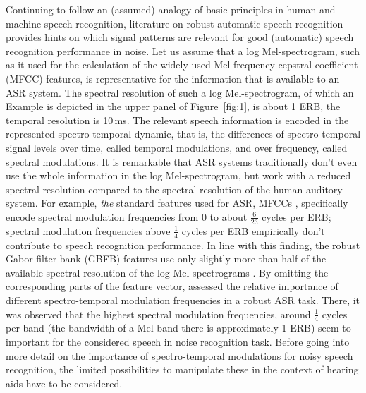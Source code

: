 \documentclass[10pt,a4paper,twocolumn]{article}
\begin{document}
Continuing to follow an (assumed) analogy of basic principles in human and machine speech recognition, literature on robust automatic speech recognition provides hints on which signal patterns are relevant for good (automatic) speech recognition performance in noise.
%
Let us assume that a log Mel-spectrogram, such as it used for the calculation of the widely used Mel-frequency cepstral coefficient (MFCC) features, is representative for the information that is available to an ASR system.
%
The spectral resolution of such a log Mel-spectrogram, of which an Example is depicted in the upper panel of Figure~\ref{fig:1}, is about 1 ERB, the temporal resolution is 10\,ms.
%
The relevant speech information is encoded in the represented spectro-temporal dynamic, that is, the differences of spectro-temporal signal levels over time, called temporal modulations, and over frequency, called spectral modulations.
%
It is remarkable that ASR systems traditionally don't even use the whole information in the log Mel-spectrogram, but work with a reduced spectral resolution compared to the spectral resolution of the human auditory system.
%
For example, \emph{the} standard features used for ASR, MFCCs \citep{etsi2007}, specifically encode spectral modulation frequencies from $0$ to about $\frac{6}{23}$ cycles per ERB; spectral modulation frequencies above $\frac{1}{4}$ cycles per ERB empirically don't contribute to speech recognition performance.
%
In line with this finding, the robust Gabor filter bank (GBFB) features use only slightly more than half of the available spectral resolution of the log Mel-spectrograms \cite[c.f.][]{schaedler2012}.
%
By omitting the corresponding parts of the feature vector, \cite{schaedler2012} assessed the relative importance of different spectro-temporal modulation frequencies in a robust ASR task.
%
There, it was observed that the highest spectral modulation frequencies, around $\frac{1}{4}$ cycles per band (the bandwidth of a Mel band there is approximately 1 ERB) seem to important for the considered speech in noise recognition task.
%
Before going into more detail on the importance of spectro-temporal modulations for noisy speech recognition,
the limited possibilities to manipulate these in the context of hearing aids have to be considered.
\end{document}
